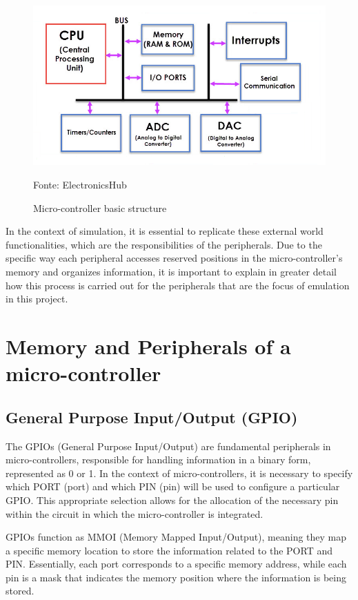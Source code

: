 \documentclass[../monografia.tex]{subfiles}
\begin{document}
\begin{figure}[h]
\centering
    \caption{Micro-controller basic structure}
    \centering %
    \includegraphics[width=14cm]{microcontroller_structure.png}
    \par
    Fonte: ElectronicsHub \cite{eletronic_hub_23}
    \label{fig: Micro-controller basic structure}
\end{figure}


In the context of simulation, it is essential to replicate these external world functionalities, which are the responsibilities of the peripherals. Due to the specific way each peripheral accesses reserved positions in the micro-controller's memory and organizes information, it is important to explain in greater detail how this process is carried out for the peripherals that are the focus of emulation in this project.


\section{Memory and Peripherals of a micro-controller}
\subsection{General Purpose Input/Output (GPIO)}
The GPIOs (General Purpose Input/Output) are fundamental peripherals in micro-controllers, responsible for handling information in a binary form, represented as 0 or 1. In the context of micro-controllers, it is necessary to specify which PORT (port) and which PIN (pin) will be used to configure a particular GPIO. This appropriate selection allows for the allocation of the necessary pin within the circuit in which the micro-controller is integrated.

GPIOs function as MMOI (Memory Mapped Input/Output), meaning they map a specific memory location to store the information related to the PORT and PIN. Essentially, each port corresponds to a specific memory address, while each pin is a mask that indicates the memory position where the information is being stored.
\end{document}
